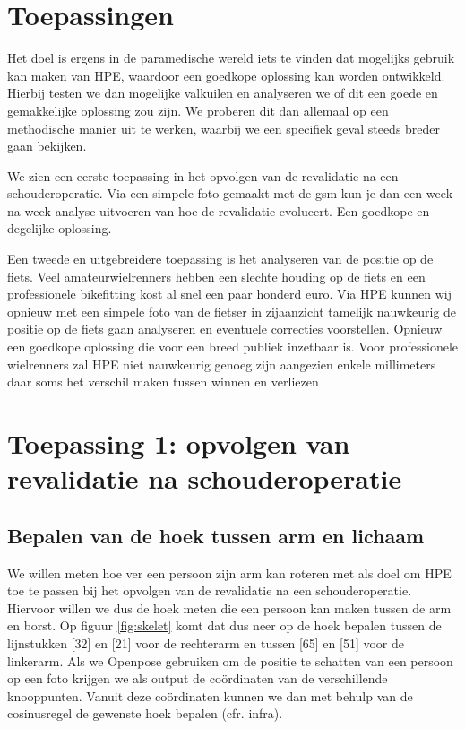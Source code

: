 \documentclass{article}
\begin{document}
\section{Toepassingen}
Het doel is ergens in de paramedische wereld iets te vinden dat mogelijks gebruik kan maken van HPE, waardoor een goedkope oplossing kan worden ontwikkeld. Hierbij testen we dan mogelijke valkuilen en analyseren we of dit een goede en gemakkelijke oplossing zou zijn. We proberen dit dan allemaal op een methodische manier uit te werken, waarbij we een specifiek geval steeds breder gaan bekijken.

We zien een eerste toepassing in het opvolgen van de revalidatie na een schouderoperatie. Via een simpele foto gemaakt met de gsm kun je dan een week-na-week analyse uitvoeren van hoe de revalidatie evolueert. Een goedkope en degelijke oplossing.

Een tweede en uitgebreidere toepassing is het analyseren van de positie op de fiets. Veel amateurwielrenners hebben een slechte houding op de fiets en een professionele bikefitting kost al snel een paar honderd euro. Via HPE kunnen wij opnieuw met een simpele foto van de fietser in zijaanzicht tamelijk nauwkeurig de positie op de fiets gaan analyseren en eventuele correcties voorstellen. Opnieuw een goedkope oplossing die voor een breed publiek inzetbaar is. Voor professionele wielrenners zal HPE niet nauwkeurig genoeg zijn aangezien enkele millimeters daar soms het verschil maken tussen winnen en verliezen

\section{Toepassing 1: opvolgen van revalidatie na schouderoperatie}
	\subsection{Bepalen van de hoek tussen arm en lichaam}

We willen meten hoe ver een persoon zijn arm kan roteren met als doel om HPE toe te passen bij het opvolgen van de revalidatie na een schouderoperatie. Hiervoor willen we dus de hoek meten die een persoon kan maken tussen de arm en borst. Op figuur \ref{fig:skelet} komt dat dus neer op de hoek bepalen tussen de lijnstukken [32] en [21] voor de rechterarm en tussen [65] en [51] voor de linkerarm. Als we Openpose gebruiken om de positie te schatten van een persoon op een foto krijgen we als output de coördinaten van de verschillende knooppunten. Vanuit deze coördinaten kunnen we dan met behulp van de cosinusregel de gewenste hoek bepalen (cfr. infra).
\end{document}
